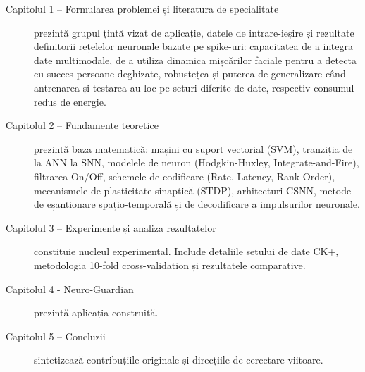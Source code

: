 \begin{description}
	\item[Capitolul 1 – Formularea problemei și literatura de specialitate] prezintă grupul țin\-tă vizat de aplicație, datele de intrare-ieșire și rezultate definitorii rețelelor neuronale bazate pe spike-uri: capacitatea de a integra date multimodale, de a utiliza dinamica mișcărilor faciale pentru a detecta cu succes persoane deghizate, robustețea și puterea de generalizare când antrenarea și testarea au loc pe seturi diferite de date, respectiv consumul redus de energie.

	\item[Capitolul 2 – Fundamente teoretice] prezintă baza matematică: mașini cu suport vectorial (SVM), tranziția de la ANN la SNN, modelele de neuron (Hodgkin-Huxley, Integrate-and-Fire), filtrarea On/Off, schemele de codificare (Rate, Latency, Rank Order), mecanismele de plasticitate sinaptică (STDP), arhitecturi CSNN, metode de eșantionare spațio-temporală și de decodificare a impulsurilor neuronale.
	
	\item[Capitolul 3 – Experimente și analiza rezultatelor] constituie nucleul experimental. Include detaliile setului de date CK+, metodologia 10-fold cross-validation și rezultatele comparative.
	
	\item[Capitolul 4 - Neuro-Guardian] prezintă aplicația construită.
	
	\item[Capitolul 5 – Concluzii] sintetizează contribuțiile originale și direcțiile de cercetare viitoare.
\end{description}
